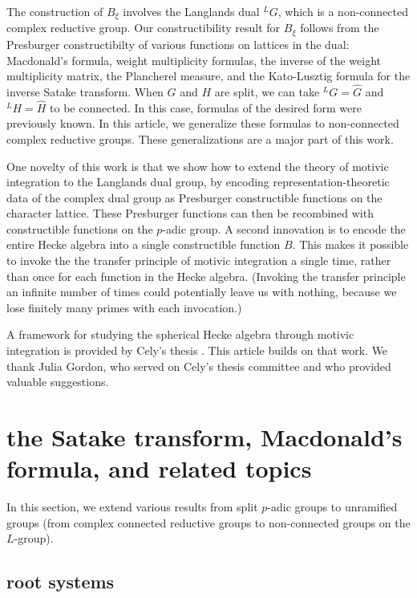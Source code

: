 The construction of $B_\xi$ involves the Langlands dual ${}^LG$, which is a non-connected complex reductive group.
Our constructibility result for $B_\xi$ follows from the  Presburger constructibilty of various
functions on lattices in the dual:  Macdonald's formula, weight multiplicity formulas, the inverse of the weight multiplicity matrix,
the Plancherel measure,
and the Kato-Lusztig formula for the inverse Satake transform.  
When $G$ and $H$ are split, we can take ${}^LG = \hat G$ and ${}^LH=\hat H$ to be connected.  In this case,
formulas of the desired form were previously known.  In this article, we
generalize these formulas to non-connected complex reductive groups.
These generalizations are a major part of this work.

One novelty of this work is that we show how to extend the theory of motivic integration to the Langlands
dual group, by encoding representation-theoretic data of the complex dual group as Presburger constructible functions on the character lattice. These
Presburger functions can then be recombined with constructible functions on the $p$-adic group.  A second innovation is
to encode the entire Hecke algebra into a single constructible function $B$.  This makes it possible to invoke the the transfer
principle of motivic integration a single time, rather than once for each function in the Hecke algebra.  (Invoking the transfer principle
an infinite number of times could potentially leave us with nothing, because we lose finitely many primes with each invocation.)

A framework for studying the spherical Hecke algebra through motivic integration is provided by Cely's thesis \cite{cely}.
This article builds on that work.  We thank Julia Gordon, who served on Cely's thesis committee and who provided valuable suggestions.



\section{the Satake transform, Macdonald's formula, and related topics}

In this section, we extend various results from split $p$-adic groups to unramified groups
(from
complex connected reductive groups to non-connected groups on the $L$-group).

\subsection{root systems}

